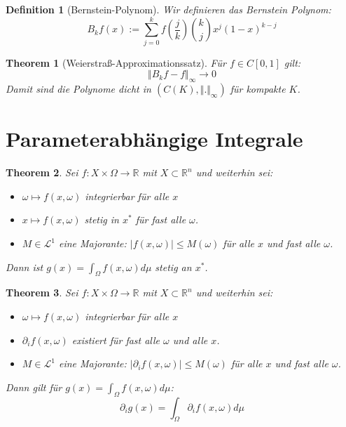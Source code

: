 \documentclass[10pt,a4paper]{article}
\newtheorem{theorem}{Theorem}
\newtheorem{definition}{Definition}
\begin{document}
\begin{definition}[Bernstein-Polynom]
	Wir definieren das Bernstein Polynom:
	$$B_kf(x):=\sum_{j=0}^{k}f(\frac{j}{k})\binom{k}{j}x^j(1-x)^{k-j}$$
\end{definition}
\begin{theorem}[Weierstraß-Approximationssatz]
	Für $f\in C[0, 1]$ gilt:
	$$\Vert B_kf-f\Vert_\infty \to 0$$
	Damit sind die Polynome dicht in $(C(K), \Vert .\Vert_\infty)$ für kompakte $K$.
\end{theorem}
\section{Parameterabhängige Integrale}
\begin{theorem}
	Sei $f: X \times \Omega \to \mathbb{R}$ mit $X \subset \mathbb{R}^n$ und weiterhin sei:
	\begin{itemize}
		\item $\omega \mapsto f(x, \omega)$ integrierbar für alle $x$
		\item $x\mapsto f(x, \omega)$ stetig in $x^*$ für fast alle $\omega$.
		\item $M\in \mathcal{L}^1$ eine Majorante: $|f(x, \omega)| \leq M(\omega)$ für alle $x$ und fast alle $\omega$.
	\end{itemize}
	Dann ist $g(x) = \int_\Omega f(x, \omega) d\mu$ stetig an $x^*$.
\end{theorem}
\begin{theorem}
	Sei $f: X \times \Omega \to \mathbb{R}$ mit $X \subset \mathbb{R}^n$ und weiterhin sei:
	\begin{itemize}
		\item $\omega \mapsto f(x, \omega)$ integrierbar für alle $x$
		\item $\partial_if(x, \omega)$ existiert für fast alle $\omega$ und alle $x$.
		\item $M\in \mathcal{L}^1$ eine Majorante: $|\partial_if(x, \omega)| \leq M(\omega)$ für alle $x$ und fast alle $\omega$.
	\end{itemize}
	Dann gilt für $g(x) = \int_\Omega f(x, \omega) d\mu$:
	$$\partial_ig(x) = \int_\Omega\partial_if(x, \omega) d\mu$$
\end{theorem}
\end{document}
